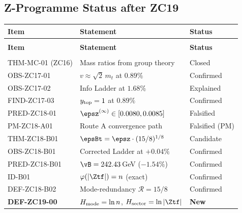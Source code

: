 \documentclass[12pt, a4paper]{article}
\begin{document}
\subsection{Z-Programme Status after ZC19}
\label{zc19:sec:status}

\begin{formalbox}[title={Z-Programme Status after TASK-ZC19}]
{\small
\setlength{\LTpre}{4pt}
\setlength{\LTpost}{4pt}
\renewcommand{\arraystretch}{1.30}
\begin{longtable}{>{\raggedright\arraybackslash}p{3.6cm}
                  >{\raggedright\arraybackslash}p{5.8cm}
                  >{\centering\arraybackslash}p{2.4cm}}
\toprule
\textbf{Item} & \textbf{Statement} & \textbf{Status} \\
\midrule
\endfirsthead
\multicolumn{3}{l}{\small\textit{(continued)}}\\[4pt]
\toprule
\textbf{Item} & \textbf{Statement} & \textbf{Status} \\
\midrule
\endhead
\midrule
\multicolumn{3}{r}{\small\textit{(continues)}}\\
\endfoot
\bottomrule
\endlastfoot
THM-MC-01 (ZC16)   & Mass ratios from group theory & Closed \\
OBS-ZC17-01        & $v\approx\sqrt{2}\,m_t$ at $0.89\%$ & Confirmed \\
OBS-ZC17-02        & Info Ladder at $1.68\%$ & Explained \\
FIND-ZC17-03       & $y_{\rm top}=1$ at $0.89\%$ & Confirmed \\
\midrule
PRED-ZC18-01       & $\epsz^{(\infty)}\in[0.0080,0.0085]$ & Falsified \\
PM-ZC18-A01        & Route A convergence path & Falsified (PM) \\
\midrule
THM-ZC18-B01       & $\epsBt = \epsz\cdot(15/8)^{1/8}$ & Candidate \\
OBS-ZC18-B01       & Corrected Ladder at $+0.04\%$ & Confirmed \\
PRED-ZC18-B01      & $\vB = 242.43$\,GeV ($-1.54\%$) & Confirmed \\
ID-B01             & $\varphi(|\Ztf|) = n$ (exact) & Confirmed \\
DEF-ZC18-B02       & Mode-redundancy $\mathcal{R}=15/8$ & Confirmed \\
\midrule
\textbf{DEF-ZC19-00} & $H_{\rm mode}=\ln n$,
                       $H_{\rm sector}=\ln|\Ztf|$ & \textbf{New} \\

\end{longtable}}
\end{formalbox}
\end{document}
